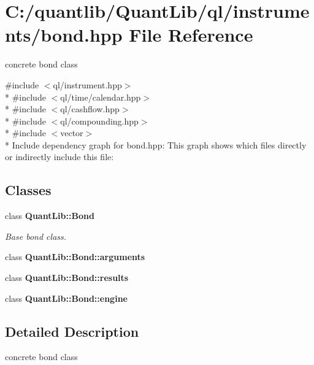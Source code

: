 \section{C\+:/quantlib/\+Quant\+Lib/ql/instruments/bond.hpp File Reference}
\label{bond_8hpp}


concrete bond class  


{\ttfamily \#include $<$ql/instrument.\+hpp$>$}\\*
{\ttfamily \#include $<$ql/time/calendar.\+hpp$>$}\\*
{\ttfamily \#include $<$ql/cashflow.\+hpp$>$}\\*
{\ttfamily \#include $<$ql/compounding.\+hpp$>$}\\*
{\ttfamily \#include $<$vector$>$}\\*
Include dependency graph for bond.\+hpp\+:
This graph shows which files directly or indirectly include this file\+:
\subsection*{Classes}
\begin{DoxyCompactItemize}
\item 
class {\bf Quant\+Lib\+::\+Bond}
\begin{DoxyCompactList}\small\item\em Base bond class. \end{DoxyCompactList}\item 
class {\bf Quant\+Lib\+::\+Bond\+::arguments}
\item 
class {\bf Quant\+Lib\+::\+Bond\+::results}
\item 
class {\bf Quant\+Lib\+::\+Bond\+::engine}
\end{DoxyCompactItemize}


\subsection{Detailed Description}
concrete bond class 

